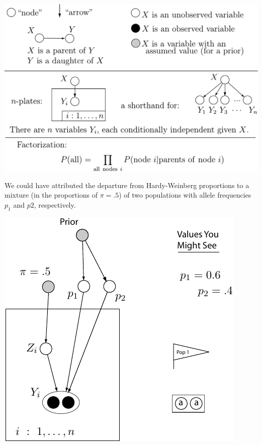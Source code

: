 \begin{center}
\includegraphics[width=\textwidth]{illus/dagnotat.pdf}
\end{center}





\vspace*{-.25in}
\enlargethispage*{1000pt}
\begin{minipage}{.43\textwidth}
We could have attributed the departure from Hardy-Weinberg proportions to a mixture (in the proportions of $\pi=.5$) of two populations with allele frequencies $p_1$ and $p2$, respectively.
\end{minipage}
\hfill
\begin{minipage}{.5\textwidth}
\includegraphics[width=\textwidth]{illus/OneLocusDAG.pdf}
\end{minipage}

